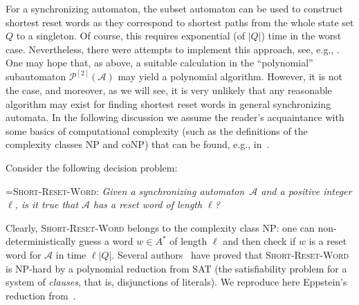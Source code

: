\documentclass{irmaart}
\newcommand{\sa}{synchronizing au\-tom\-a\-ta}
\newcommand{\san}{synchronizing au\-tom\-a\-ton}
\theoremstyle{plain}
\begin{document}
For a \san, the subset automaton can be used to construct shortest reset words
as they correspond to shortest paths from the whole state set $Q$ to a
singleton. Of course, this requires exponential (of $|Q|$) time in the worst
case. Nevertheless, there were attempts to implement this approach, see, e.g.,
\cite{Rho&Somenzi&Pixley:1993,Trahtman:2006}. One may hope that, as above, a
suitable calculation in the ``polynomial'' subautomaton
$\mathcal{P}^{[2]}(\mathcal{A})$ may yield a polynomial algorithm. However, it
is not the case, and moreover, as we will see, it is very unlikely that any
reasonable algorithm may exist for finding shortest reset words in general \sa.
In the following discussion we assume the reader's acquaintance with some
basics of computational complexity (such as the definitions of the complexity
classes \textsf{NP} and \textsf{coNP}) that can be found, e.g.,
in~\cite{Garey&Johnson:1979,Papadimitriou:1994}.

Consider the following decision
problem:

\smallskip

\hangindent=\parindent \noindent\textsc{Short-Reset-Word:}
\emph{Given a \san\ $\mathcal{A}$ and a positive integer $\ell$,
is it true that $\mathcal{A}$ has a reset word of length $\ell$?}

\smallskip

Clearly, \textsc{Short-Reset-Word} belongs to the complexity class
\textsf{NP}: one can non-deterministically guess a word $w\in A^*$
of length $\ell$ and then check if $w$ is a reset word for
$\mathcal{A}$ in time $\ell|Q|$. Several
authors~\cite{Rystsov:1980,Eppstein:1990,Goralcik&Koubek:1995,Salomaa:2003,Samotij:2007}
have proved that \textsc{Short-Reset-Word} is \textsf{NP}-hard by
a polynomial reduction from \textsc{SAT} (the satisfiability
problem for a system of \emph{clauses}, that is, disjunctions of
literals). We reproduce here Eppstein's reduction
from~\cite{Eppstein:1990}.
\end{document}

